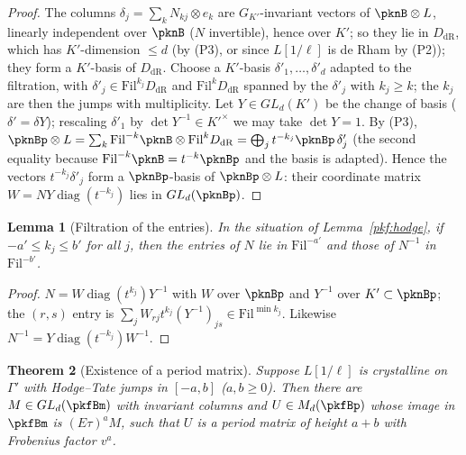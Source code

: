 \documentclass[10pt]{amsart}
\newtheorem{theorem}{Theorem}[section]
\newtheorem{lemma}[theorem]{Lemma}
\theoremstyle{definition}
\theoremstyle{remark}
\begin{document}
\begin{proof}
The columns $\delta_j=\sum_kN_{kj}\otimes e_k$ are $G_{K'}$-invariant vectors of $\pknB\otimes L$, linearly
independent over $\pknB$ ($N$ invertible), hence over $K'$; so they lie in $D_{\mathrm{dR}}$, which has
$K'$-dimension $\le d$ (by (P3), or since $L[1/\ell]$ is de Rham by (P2)); they form a $K'$-basis of
$D_{\mathrm{dR}}$. Choose a $K'$-basis $\delta'_1,\dots,\delta'_d$ adapted to the filtration, with
$\delta'_j\in\mathrm{Fil}^{k_j}D_{\mathrm{dR}}$ and $\mathrm{Fil}^kD_{\mathrm{dR}}$ spanned by the
$\delta'_j$ with $k_j\ge k$; the $k_j$ are then the jumps with multiplicity. Let $Y\in GL_d(K')$ be the
change of basis ($\delta'=\delta Y$); rescaling $\delta'_1$ by $\det Y^{-1}\in K'^\times$ we may take
$\det Y=1$. By (P3), $\pknBp\otimes L=\sum_k\mathrm{Fil}^{-k}\pknB\otimes\mathrm{Fil}^kD_{\mathrm{dR}}
=\bigoplus_j t^{-k_j}\pknBp\,\delta'_j$ (the second equality because $\mathrm{Fil}^{-k}\pknB=t^{-k}\pknBp$
and the basis is adapted). Hence the vectors $t^{-k_j}\delta'_j$ form a $\pknBp$-basis of $\pknBp\otimes
L$: their coordinate matrix $W=NY\operatorname{diag}(t^{-k_j})$ lies in $GL_d(\pknBp)$.
\end{proof}

\begin{lemma}[Filtration of the entries]\label{pkf:fil}
In the situation of Lemma~\ref{pkf:hodge}, if $-a'\le k_j\le b'$ for all $j$, then the entries of $N$
lie in $\mathrm{Fil}^{-a'}$ and those of $N^{-1}$ in $\mathrm{Fil}^{-b'}$.
\end{lemma}

\begin{proof}
$N=W\operatorname{diag}(t^{k_j})Y^{-1}$ with $W$ over $\pknBp$ and $Y^{-1}$ over $K'\subset\pknBp$; the
$(r,s)$ entry is $\sum_jW_{rj}t^{k_j}(Y^{-1})_{js}\in\mathrm{Fil}^{\min k_j}$. Likewise
$N^{-1}=Y\operatorname{diag}(t^{-k_j})W^{-1}$.
\end{proof}

\begin{theorem}[Existence of a period matrix]\label{pkf:pm}
Suppose $L[1/\ell]$ is crystalline on $\Gamma'$ with Hodge--Tate jumps in $[-a,b]$ ($a,b\ge0$). Then
there are $M\in GL_d(\pkfBm)$ with invariant columns and $U\in M_d(\pkfBp)$ whose image in $\pkfBm$ is
$(E\tau)^aM$, such that $U$ is a period matrix of height $a+b$ with Frobenius factor $v^a$.
\end{theorem}
\end{document}
